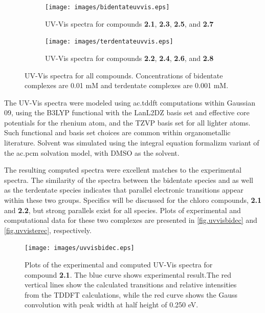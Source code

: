 \begin{figure}[!htb]
 \centering
 \begin{subfigure}[b]{0.49\textwidth}
  \texttt{[image: images/bidentateuvvis.eps]}
  \caption{UV-Vis spectra for compounds \textbf{2.1}, \textbf{2.3}, \textbf{2.5}, and \textbf{2.7}}
  \label{fig.uvvisbids}
 \end{subfigure}
 \begin{subfigure}[b]{0.49\textwidth}
  \texttt{[image: images/terdentateuvvis.eps]}
  \caption{UV-Vis spectra for compounds \textbf{2.2}, \textbf{2.4}, \textbf{2.6}, and \textbf{2.8}}
  \label{fig.uvvisters}
 \end{subfigure}
\caption[UV-Vis spectra for all compounds]{UV-Vis spectra for all compounds. Concentrations of bidentate complexes are 0.01 mM and terdentate complexes are 0.001 mM.}
\label{fig.uvvisexps}
\end{figure} 

The UV-Vis spectra were modeled using \gls{ac.tddft} computations within Gaussian 09, using the B3LYP functional with the LanL2DZ basis set and effective core potentials for the rhenium atom, and the TZVP basis set for all lighter atoms. Such functional and basis set choices are common within organometallic literature. Solvent was simulated using the integral equation formalizm variant of the \gls{ac.pcm} solvation model, with DMSO as the solvent. 

The resulting computed spectra were excellent matches to the experimental spectra. The similarity of the spectra between the bidentate species and as well as the terdentate species indicates that parallel electronic transitions appear within these two groups. Specifics will be discussed for the chloro compounds, \textbf{2.1} and \textbf{2.2}, but strong parallels exist for all species. Plots of experimental and computational data for these two complexes are presented in \autoref{fig.uvvisbidec} and \autoref{fig.uvvisterec}, respectively.

\begin{figure}[!htb]
 \centering
  \texttt{[image: images/uvvisbidec.eps]}
 \caption[Plots of the experimental and computed UV-Vis spectra for compound \textbf{2.1}]{Plots of the experimental and computed UV-Vis spectra for compound \textbf{2.1}. The blue curve shows experimental result.The red vertical lines show the calculated transitions and relative intensities from the TDDFT calculations, while the red curve shows the Gauss convolution with peak width at half height of 0.250 eV.}
 \label{fig.uvvisbidec}
\end{figure}

